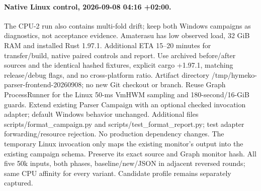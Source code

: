 \documentclass[11pt,a4paper]{article}
\begin{document}
\paragraph{Native Linux control, 2026-09-08 04:16 +02:00.}
The CPU-2 run also contains multi-fold drift; keep both Windows campaigns as
diagnostics, not acceptance evidence. Amaterasu has low observed load, 32 GiB RAM
and installed Rust 1.97.1. Additional ETA 15--20 minutes for transfer/build, native
paired controls and report. Use archived before/after sources and the identical
hashed fixtures, explicit cargo +1.97.1, matching release/debug flags, and no
cross-platform ratio. Artifact directory /tmp/hymeko-parser-frontend-20260908;
no new Git checkout or branch. Reuse Graph ProcessRunner for the Linux 50-ms
VmHWM sampling and 180-second/16-GiB guards. Extend existing Parser Campaign with
an optional checked invocation adapter; default Windows behavior unchanged.
Additional files scripts/format\_campaign.py and scripts/test\_format\_report.py;
test adapter forwarding/resource rejection. No production dependency changes.
The temporary Linux invocation only maps the existing monitor's output into the
existing campaign schema. Preserve its exact source and Graph monitor hash.
All five 50k inputs, both phases, baseline/new/JSON in adjacent reversed rounds;
same CPU affinity for every variant. Candidate profile remains separately captured.
\end{document}
